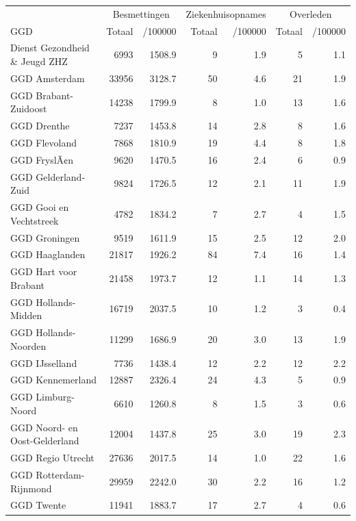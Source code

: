 \documentclass[
  english,
  man,floatsintext]{apa6}
\begin{document}
\begin{table}
\centering\begingroup\fontsize{10}{12}\selectfont

\begin{threeparttable}
\begin{tabular}{lrrrrrr}
\toprule
\multicolumn{1}{c}{ } & \multicolumn{2}{c}{Besmettingen} & \multicolumn{2}{c}{Ziekenhuisopnames} & \multicolumn{2}{c}{Overleden} \\
\cmidrule(l{3pt}r{3pt}){2-3} \cmidrule(l{3pt}r{3pt}){4-5} \cmidrule(l{3pt}r{3pt}){6-7}
GGD & Totaal & /100000 & Totaal & /100000 & Totaal & /100000\\
\midrule
Dienst Gezondheid \& Jeugd ZHZ & 6993 & 1508.9 & 9 & 1.9 & 5 & 1.1\\
GGD Amsterdam & 33956 & 3128.7 & 50 & 4.6 & 21 & 1.9\\
GGD Brabant-Zuidoost & 14238 & 1799.9 & 8 & 1.0 & 13 & 1.6\\
GGD Drenthe & 7237 & 1453.8 & 14 & 2.8 & 8 & 1.6\\
GGD Flevoland & 7868 & 1810.9 & 19 & 4.4 & 8 & 1.8\\
GGD FryslÃ¢n & 9620 & 1470.5 & 16 & 2.4 & 6 & 0.9\\
GGD Gelderland-Zuid & 9824 & 1726.5 & 12 & 2.1 & 11 & 1.9\\
GGD Gooi en Vechtstreek & 4782 & 1834.2 & 7 & 2.7 & 4 & 1.5\\
GGD Groningen & 9519 & 1611.9 & 15 & 2.5 & 12 & 2.0\\
GGD Haaglanden & 21817 & 1926.2 & 84 & 7.4 & 16 & 1.4\\
GGD Hart voor Brabant & 21458 & 1973.7 & 12 & 1.1 & 14 & 1.3\\
GGD Hollands-Midden & 16719 & 2037.5 & 10 & 1.2 & 3 & 0.4\\
GGD Hollands-Noorden & 11299 & 1686.9 & 20 & 3.0 & 13 & 1.9\\
GGD IJsselland & 7736 & 1438.4 & 12 & 2.2 & 12 & 2.2\\
GGD Kennemerland & 12887 & 2326.4 & 24 & 4.3 & 5 & 0.9\\
GGD Limburg-Noord & 6610 & 1260.8 & 8 & 1.5 & 3 & 0.6\\
GGD Noord- en Oost-Gelderland & 12004 & 1437.8 & 25 & 3.0 & 19 & 2.3\\
GGD Regio Utrecht & 27636 & 2017.5 & 14 & 1.0 & 22 & 1.6\\
GGD Rotterdam-Rijnmond & 29959 & 2242.0 & 30 & 2.2 & 16 & 1.2\\
GGD Twente & 11941 & 1883.7 & 17 & 2.7 & 4 & 0.6\\

\end{tabular}
\end{threeparttable}
\end{table}
\end{document}
